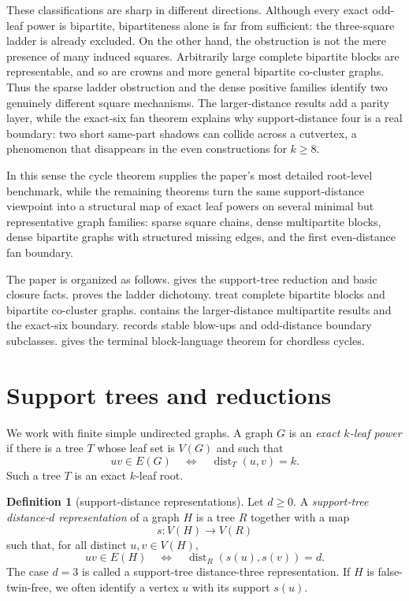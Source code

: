 \documentclass[11pt]{article}
\theoremstyle{definition}
\newtheorem{definition}[theorem]{Definition}
\newcommand{\dist}{\operatorname{dist}}
\begin{document}
These classifications are sharp in different directions.  Although every exact odd-leaf power is bipartite, bipartiteness alone is far from sufficient: the three-square ladder is already excluded.  On the other hand, the obstruction is not the mere presence of many induced squares.  Arbitrarily large complete bipartite blocks are representable, and so are crowns and more general bipartite co-cluster graphs.  Thus the sparse ladder obstruction and the dense positive families identify two genuinely different square mechanisms.  The larger-distance results add a parity layer, while the exact-six fan theorem explains why support-distance four is a real boundary: two short same-part shadows can collide across a cutvertex, a phenomenon that disappears in the even constructions for $k\ge8$.

In this sense the cycle theorem supplies the paper's most detailed root-level benchmark, while the remaining theorems turn the same support-distance viewpoint into a structural map of exact leaf powers on several minimal but representative graph families: sparse square chains, dense multipartite blocks, dense bipartite graphs with structured missing edges, and the first even-distance fan boundary.

The paper is organized as follows.   gives the support-tree reduction and basic closure facts.   proves the ladder dichotomy.   treat complete bipartite blocks and bipartite co-cluster graphs.   contains the larger-distance multipartite results and the exact-six boundary.   records stable blow-ups and odd-distance boundary subclasses.   gives the terminal block-language theorem for chordless cycles.

\section{Support trees and reductions}\label{sec:support}

We work with finite simple undirected graphs.  A graph $G$ is an \emph{exact $k$-leaf power} if there is a tree $T$ whose leaf set is $V(G)$ and such that
\[
 uv\in E(G) \quad\Longleftrightarrow\quad \dist_T(u,v)=k.
\]
Such a tree $T$ is an exact $k$-leaf root.

\begin{definition}[support-distance representations]\label{def:support-distance}
Let $d\ge0$.  A \emph{support-tree distance-$d$ representation} of a graph $H$ is a tree $R$ together with a map
\[
 s:V(H)\to V(R)
\]
such that, for all distinct $u,v\in V(H)$,
\[
 uv\in E(H) \quad\Longleftrightarrow\quad \dist_R(s(u),s(v))=d.
\]
The case $d=3$ is called a support-tree distance-three representation.  If $H$ is false-twin-free, we often identify a vertex $u$ with its support $s(u)$.
\end{definition}
\end{document}
